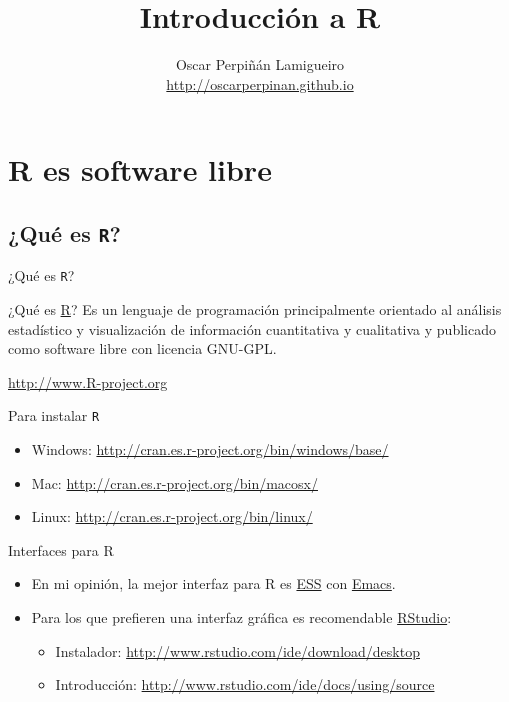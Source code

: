 \documentclass[xcolor={usenames,svgnames,dvipsnames}]{beamer}
\author{Oscar Perpiñán Lamigueiro \\ \url{http://oscarperpinan.github.io}}
\date{}
\title{Introducción a R}
\begin{document}
\maketitle


\section{R es software libre}
\label{sec-1}
\subsection{¿Qué es \texttt{R}?}
\label{sec-1-1}
\begin{frame}[fragile,label=sec-1-1-1]{¿Qué es \texttt{R}?}
 \begin{block}{¿Qué es \href{http://procomun.wordpress.com/2011/02/23/que-es-r/}{R}?}
Es un lenguaje de programación principalmente orientado al
análisis estadístico y visualización de información cuantitativa y
cualitativa y publicado como software libre con licencia GNU-GPL.
\begin{center}
\url{http://www.R-project.org} 
\end{center}
\end{block}
\end{frame}
\begin{frame}[fragile,label=sec-1-1-2]{Para instalar \texttt{R}}
 \begin{itemize}
\item Windows: \url{http://cran.es.r-project.org/bin/windows/base/}
\item Mac: \url{http://cran.es.r-project.org/bin/macosx/}
\item Linux: \url{http://cran.es.r-project.org/bin/linux/}
\end{itemize}
\end{frame}
\begin{frame}[label=sec-1-1-3]{Interfaces para R}
\begin{itemize}
\item En mi opinión, la mejor interfaz para R es \href{http://ess.r-project.org/}{ESS} con \href{http://www.gnu.org/software/emacs/}{Emacs}.
\item Para los que prefieren una interfaz gráfica es recomendable \href{http://www.rstudio.com/ide/}{RStudio}:
\begin{itemize}
\item Instalador: \url{http://www.rstudio.com/ide/download/desktop}
\item Introducción: \url{http://www.rstudio.com/ide/docs/using/source}
\end{itemize}
\end{itemize}
\end{frame}
\end{document}
